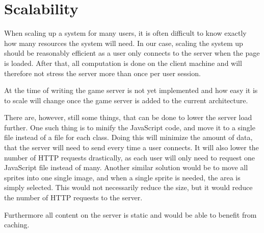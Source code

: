 \section{Scalability}
When scaling up a system for many users, it is often difficult to know exactly how many resources the system will need.
In our case, scaling the system up should be reasonably efficient as a user only connects to the server when the page is loaded.
After that, all computation is done on the client machine and will therefore not stress the server more than once per user session.\newline

At the time of writing the game server is not yet implemented and how easy it is to scale will change once the game server is added to the current architecture.\newline


There are, however, still some things, that can be done to lower the server load further.
One such thing is to minify the JavaScript code, and move it to a single file instead of a file for each class.
Doing this will minimize the amount of data, that the server will need to send every time a user connects.
It will also lower the number of HTTP requests drastically, as each user will only need to request one JavaScript file instead of many.
Another similar solution would be to move all sprites into one single image, and when a single sprite is needed, the area is simply selected. This would not necessarily reduce the size, but it would reduce the number of HTTP requests to the server.\newline

Furthermore all content on the server is static and would be able to benefit from caching. 
